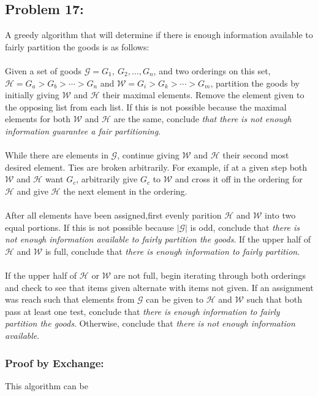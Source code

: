 \documentclass[12pt]{article}
\begin{document}
\subsection*{Problem 17:}
A greedy algorithm that will determine if there is enough
information available to fairly partition the goods is as 
follows:\\\\
Given a set of goods $\mathcal{G}={G_1,\ G_2,\dots,G_n}$,
and two orderings on this set, $\mathcal{H}=G_a > G_b >
\cdots > G_n$ and $\mathcal{W}=G_i > G_k > \cdots > G_m$,
partition the goods by initially giving $\mathcal{W}$ and 
$\mathcal{H}$ their maximal elements.
Remove the element given to the opposing list from each list.
If this is not possible
because the maximal elements for both $\mathcal{W}$ and
$\mathcal{H}$ are the same, conclude \textit{that there is not
enough information guarantee a fair partitioning}.\\\\  
While there are elements in $\mathcal{G}$, continue
giving $\mathcal{W}$ and $\mathcal{H}$ their second
most desired element.  Ties are broken arbitrarily.  For 
example, if at a given step both $\mathcal{W}$ and $\mathcal{H}$
want $G_c$, arbitrarily give $G_c$ to $\mathcal{W}$ and
cross it off in the ordering for $\mathcal{H}$ and give
$\mathcal{H}$ the next element in the ordering.\\\\
After all elements have been assigned,first evenly parition  
$\mathcal{H}$ and $\mathcal{W}$ into two equal portions.
If this is not possible because $|\mathcal{G}|$ is odd,
conclude that \textit{there is not enough information available
to fairly partition the goods}.  If the upper half of  
$\mathcal{H}$ and $\mathcal{W}$ is full, conclude that 
\textit{there is enough information to fairly partition}.\\\\
If the upper half of $\mathcal{H}$ or $\mathcal{W}$ are
not full, begin iterating through both orderings and 
check to see that items given alternate with items not given.
If an assignment was reach such that elements from $\mathcal{G}$
can be given to $\mathcal{H}$ and $\mathcal{W}$ such that both
pass at least one test, conclude that \textit{there is enough
information to fairly partition the goods}.  Otherwise, conclude
that \textit{there is not enough information available}.
\subsubsection*{Proof by Exchange:}
This algorithm can be    
\end{document}
